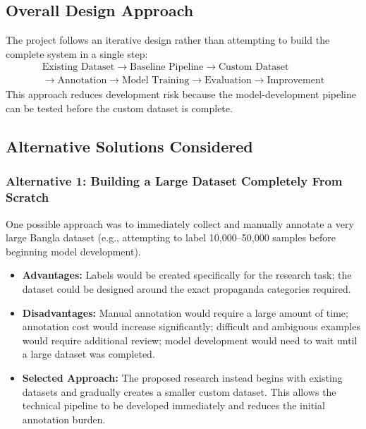 \documentclass[12pt,a4paper]{report}
\begin{document}
\subsection{Overall Design Approach}
The project follows an iterative design rather than attempting to build the
complete system in a single step:
\[
\begin{gathered}
\text{Existing Dataset} \rightarrow \text{Baseline Pipeline} \rightarrow \text{Custom Dataset} \\
\rightarrow \text{Annotation} \rightarrow \text{Model Training} \rightarrow \text{Evaluation} \rightarrow \text{Improvement}
\end{gathered}
\]
This approach reduces development risk because the model-development pipeline can
be tested before the custom dataset is complete.

\subsection{Alternative Solutions Considered}

\subsubsection{Alternative 1: Building a Large Dataset Completely From Scratch}
One possible approach was to immediately collect and manually annotate a very large
Bangla dataset (e.g., attempting to label 10,000--50,000 samples before beginning
model development).
\begin{itemize}
  \item \textbf{Advantages:} Labels would be created specifically for the research
        task; the dataset could be designed around the exact propaganda categories
        required.
  \item \textbf{Disadvantages:} Manual annotation would require a large amount of
        time; annotation cost would increase significantly; difficult and
        ambiguous examples would require additional review; model development
        would need to wait until a large dataset was completed.
  \item \textbf{Selected Approach:} The proposed research instead begins with
        existing datasets and gradually creates a smaller custom dataset. This
        allows the technical pipeline to be developed immediately and reduces the
        initial annotation burden.
\end{itemize}
\end{document}
